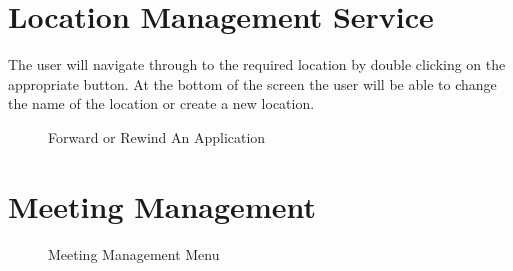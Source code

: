 \documentclass[12pt]{article}
\begin{document}
\newpage
\section{Location Management Service}
The user will navigate through to the required location by double clicking on the appropriate button. At the bottom of the screen the user will be able to change the name of the location or create a new location.
\begin{figure}[H]
\centering	
{}
\caption{Forward or Rewind An Application}

\end{figure}

\newpage
\section{Meeting Management}

\begin{figure}[H]
\centering	
{}
\caption{Meeting Management Menu}
\end{figure}
\end{document}
